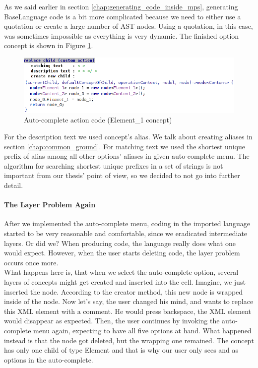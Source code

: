 As we said earlier in section \ref{chap:generating_code_inside_mps}, generating BaseLanguage code is a bit more complicated because we need to either use a quotation or create a large number of AST nodes.
Using a quotation, in this case, was sometimes impossible as everything is very dynamic.
The finished option concept is shown in Figure \ref{fig:autocomplete_action}.

\begin{figure}[h]
	\centering
	\includegraphics[width=\textwidth]{./img/autocomplete_action.png}
	\caption{Auto-complete action code (Element{\_}1 concept)}
	\label{fig:autocomplete_action}
\end{figure}

For the description text we used concept's alias.
We talk about creating aliases in section \ref{chap:common_ground}.
For matching text we used the shortest unique prefix of alias among all other options' aliases in given auto-complete menu.
The algorithm for searching shortest unique prefixes in a set of strings is not important from our thesis' point of view, so we decided to not go into further detail.


\paragraph{The Layer Problem Again}

After we implemented the auto-complete menu, coding in the imported language started to be very reasonable and comfortable, since we eradicated intermediate layers.
Or did we?
When producing code, the language really does what one would expect.
However, when the user starts deleting code, the layer problem occurs once more.
\\

What happens here is, that when we select the auto-complete option, several layers of concepts might get created and inserted into the cell.
Imagine, we just inserted the  node.
According to the creator method, this new node is wrapped inside of the  node.
Now let's say, the user changed his mind, and wants to replace this XML element with a comment.
He would press backspace, the XML element would disappear as expected.
Then, the user continues by invoking the auto-complete menu again, expecting to have all five options at hand.
What happened instead is that the  node got deleted, but the wrapping  one remained.
The  concept has only one child of type Element and that is why our user only sees  and  as options in the auto-complete.


